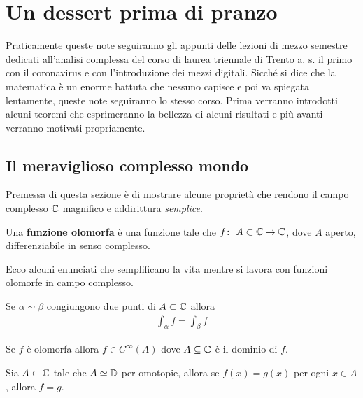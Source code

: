 \chapter{Un dessert prima di pranzo}

Praticamente queste note seguiranno gli appunti delle lezioni di mezzo semestre dedicati all'analisi complessa del corso di laurea triennale di Trento a. s. il primo con il coronavirus e con l'introduzione dei mezzi digitali.
Sicché si dice che la matematica è un enorme battuta che nessuno capisce e poi va spiegata lentamente, 
queste note seguiranno lo stesso corso. Prima verranno introdotti alcuni teoremi che esprimeranno la bellezza di alcuni risultati 
e più avanti verranno motivati propriamente.

\section{Il meraviglioso complesso mondo}

Premessa di questa sezione è di mostrare alcune proprietà che rendono il campo complesso $\mathbb{C}$ magnifico e addirittura \textit{semplice}.

\begin{definition}
	Una \textbf{funzione olomorfa} è una funzione tale che $f \colon\ A \subset \mathbb{C} \rightarrow \mathbb{C}$, dove $A$ aperto, differenziabile in senso complesso. 
\end{definition}

Ecco alcuni enunciati che semplificano la vita mentre si lavora con funzioni olomorfe in campo complesso.
\begin{theorem}
	Se $\alpha \sim \beta$ congiungono due punti di $A \subset \mathbb{C}$ allora 
	\begin{equation}
	\begin{aligned}
	\int_\alpha f = \int_\beta f
	\end{aligned}
	\end{equation}
\end{theorem}

\begin{theorem}[Regolarità]
	Se $f$ è olomorfa allora $f \in C^{\infty}(A)$ dove $A\subseteq \mathbb{C}$ è il dominio di $f$.
\end{theorem}

\begin{theorem}
	Sia $A\subset \mathbb{C}$ tale che $A \simeq \mathbb{D}$ per omotopie, allora se $f(x) = g(x)$ per ogni $x\in A$, allora $f = g$.
\end{theorem}
